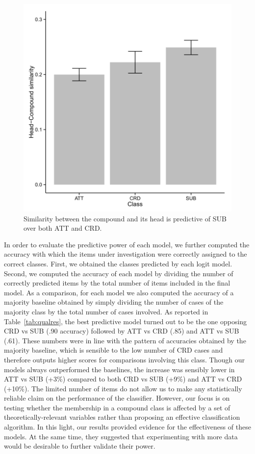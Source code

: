 \begin{figure}[t!]
\begin{center}
\includegraphics[scale=0.9]{figures/barplot2.png}
\caption{Similarity between the compound and its head is predictive of SUB over both ATT and CRD.}\label{fig:bar2}
\end{center}
\end{figure}


In order to evaluate the predictive power of each model, we further computed the accuracy with which the items under investigation were correctly assigned to the correct classes. First, we obtained the classes predicted by each logit model. Second, we computed the accuracy of each model by dividing the number of correctly predicted items by the total number of items included in the final model. As a comparison, for each model we also computed the accuracy of a majority baseline obtained by simply dividing the number of cases of the majority class by the total number of cases involved.  As reported in Table~\ref{tab:qualres}, the best predictive model turned out to be the one opposing CRD vs SUB (.90 accuracy) followed by ATT vs CRD (.85) and ATT vs SUB (.61). These numbers were in line with the pattern of accuracies obtained by the majority baseline, which is sensible to the low number of CRD cases and therefore outputs higher scores for comparisons involving this class. Though our models always outperformed the baselines, the increase was sensibly lower in ATT vs SUB (+3\%) compared to both CRD vs SUB (+9\%) and ATT vs CRD (+10\%). The limited number of items do not allow us to make any statistically reliable claim on the performance of the classifier. However, our focus is on testing whether the membership in a compound class is affected by a set of theoretically-relevant variables rather than proposing an effective classification algorithm. In this light, our results provided evidence for the effectiveness of these models. At the same time, they suggested that experimenting with more data would be desirable to further validate their power.



